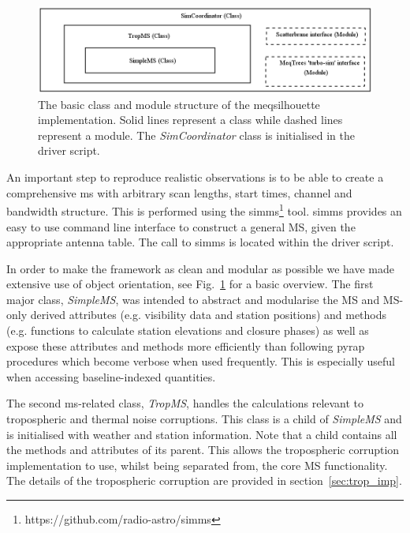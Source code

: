 

\begin{figure}
\includegraphics[width=\columnwidth]{Images/Class_module_structure}
\caption[The basic class and module structure of the {\sc meqsilhouette} implementation.]{The basic class and module structure of the {\sc meqsilhouette} implementation. Solid lines represent a class while dashed lines represent a module. The \emph{SimCoordinator} class is initialised in the driver script. \label{class_struc}%
}
\end{figure}

An important step to reproduce realistic observations is to be able to create a comprehensive {\sc ms} with arbitrary scan lengths, start times, channel and bandwidth structure. This is performed using the {\sc simms}\footnote{https://github.com/radio-astro/simms} tool. {\sc simms} provides an easy to use command line interface to construct a general MS, given the appropriate antenna table. The call to {\sc simms} is located within the driver script. 

In order to make the framework as clean and  modular as possible we have made extensive use of object orientation, see Fig.~\ref{class_struc} for a basic overview. The first major class, \emph{SimpleMS}, was intended to abstract and modularise the MS and MS-only derived attributes (e.g. visibility data and station positions) and methods (e.g. functions to calculate station elevations and closure phases) as well as expose these attributes and methods more efficiently than following {\sc pyrap} procedures which become verbose when used frequently. This is especially useful when accessing baseline-indexed quantities. 

The second {\sc ms}-related class, \emph{TropMS}, handles the calculations relevant to tropospheric and thermal noise corruptions. This class is a child of {\it SimpleMS} and is initialised with weather and station information. Note that a child contains all the methods and attributes of its parent. This allows the tropospheric corruption implementation to use, whilst being separated from, the core MS functionality. The details of the tropospheric corruption are provided in section~\ref{sec:trop_imp}. 

